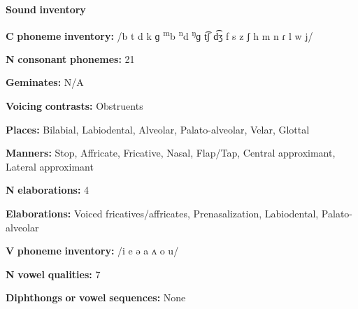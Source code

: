 \documentclass[output=paper]{langsci/langscibook}
\begin{document}
\begin{styleBody}
\textbf{Sound} \textbf{inventory}
\end{styleBody}

\begin{styleBody}
\textbf{C} \textbf{phoneme} \textbf{inventory:} /b t d k ɡ \textsuperscript{m}b \textsuperscript{n}d \textsuperscript{ŋ}ɡ t͡ʃ d͡ʒ f s z ʃ h m n ɾ l w j/
\end{styleBody}

\begin{styleBody}
\textbf{N} \textbf{consonant} \textbf{phonemes:} 21
\end{styleBody}

\begin{styleBody}
\textbf{Geminates:} N/A
\end{styleBody}

\begin{styleBody}
\textbf{Voicing} \textbf{contrasts:} Obstruents
\end{styleBody}

\begin{styleBody}
\textbf{Places:} Bilabial, Labiodental, Alveolar, Palato-alveolar, Velar, Glottal
\end{styleBody}

\begin{styleBody}
\textbf{Manners:} Stop, Affricate, Fricative, Nasal, Flap/Tap, Central approximant, Lateral approximant
\end{styleBody}

\begin{styleBody}
\textbf{N} \textbf{elaborations:} 4
\end{styleBody}

\begin{styleBody}
\textbf{Elaborations:} Voiced fricatives/affricates, Prenasalization, Labiodental, Palato-alveolar
\end{styleBody}

\begin{styleBody}
\textbf{V} \textbf{phoneme} \textbf{inventory:} /i e ə a ʌ o u/
\end{styleBody}

\begin{styleBody}
\textbf{N} \textbf{vowel} \textbf{qualities:} 7
\end{styleBody}

\begin{styleBody}
\textbf{Diphthongs} \textbf{or} \textbf{vowel} \textbf{sequences:} None
\end{styleBody}
\end{document}
